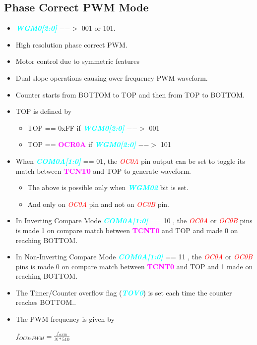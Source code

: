 \documentclass{article}
\newcommand{\bitFormat}[1]{\emph{\textbf{\textcolor{cyan}{#1}}}}
\newcommand{\regFormat}[1]{\textbf{\textcolor{magenta}{#1}}}
\newcommand{\pinFormat}[1]{\emph{\textcolor{red}{#1}}}
\begin{document}
\subsection{Phase Correct PWM Mode}
\begin{itemize}
    \item \bitFormat{WGM0[2:0]} $-->$ 001 or 101.
    \item High resolution phase correct PWM.
    \item Motor control due to symmetric features
    \item Dual slope operations causing ower frequency PWM waveform.
    \item Counter starts from BOTTOM to TOP and then from TOP to BOTTOM.
    \item TOP is defined by
    \begin{itemize}
        \item TOP == 0xFF if \bitFormat{WGM0[2:0]} $-->$ 001
        \item TOP == \regFormat{OCR0A} if \bitFormat{WGM0[2:0]} $-->$ 101
    \end{itemize}
    \item  When \bitFormat{COM0A[1:0]} == 01, the \pinFormat{OC0A} pin output can be set to toggle its match between \regFormat{TCNT0} and TOP to generate waveform.
    \begin{itemize}
        \item The above is possible only when \bitFormat{WGM02} bit is set.
        \item And only on \pinFormat{OC0A} pin and not on \pinFormat{OC0B} pin.
    \end{itemize}
    \item In Inverting Compare Mode \bitFormat{COM0A[1:0]} == 10 , the \pinFormat{OC0A} or \pinFormat{OC0B} pins is made 1 on compare match between \regFormat{TCNT0} and TOP and made 0 on reaching BOTTOM.
    \item In Non-Inverting Compare Mode \bitFormat{COM0A[1:0]} == 11 , the \pinFormat{OC0A} or \pinFormat{OC0B} pins is made 0 on compare match between \regFormat{TCNT0} and TOP and 1 made  on reaching BOTTOM.
    \item The Timer/Counter overflow flag (\bitFormat{TOV0}) is set each time the counter reaches BOTTOM..
    \item The PWM frequency is given by 
    \begin{center}
        { \Large $f_{OC0xPWM} = \frac{f_{clkT0}}{N * 510}$ }
    \end{center}
\end{itemize}
\end{document}
